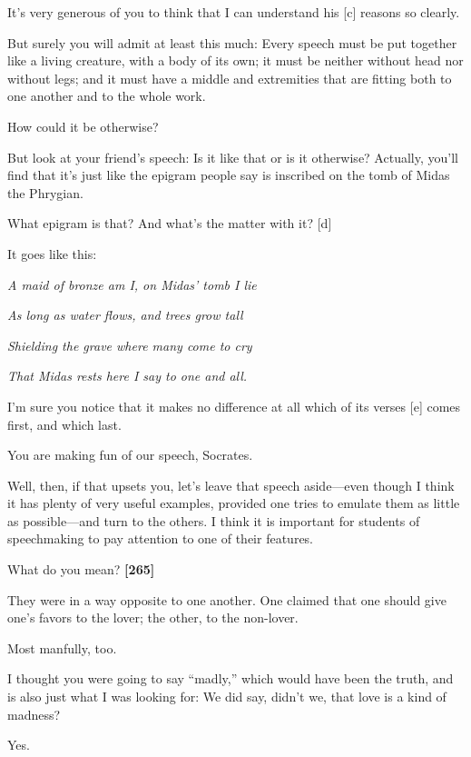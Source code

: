 \sayphaedrus It's very generous of you to think that I can understand his
{[}c{]} reasons so clearly.

\saysocrates But surely you will admit at least this much: Every speech
must be put together like a living creature, with a body of its own; it
must be neither without head nor without legs; and it must have a middle
and extremities that are fitting both to one another and to the whole
work.

\sayphaedrus How could it be otherwise?

\saysocrates But look at your friend's speech: Is it like that or is it
otherwise? Actually, you'll find that it's just like the epigram people
say is inscribed on the tomb of Midas the Phrygian.

\sayphaedrus What epigram is that? And what's the matter with it? {[}d{]}

\saysocrates It goes like this:\crlf
\crlf

{\em A maid of bronze am I, on Midas' tomb I lie}

{\em As long as water flows, and trees grow tall}

{\em Shielding the grave where many come to cry}

{\em That Midas rests here I say to one and all.}\crlf
\crlf

I'm sure you notice that it makes no difference at all which of its
verses {[}e{]} comes first, and which last.

\sayphaedrus You are making fun of our speech, Socrates.

\saysocrates Well, then, if that upsets you, let's leave that speech
aside---even though I think it has plenty of very useful examples,
provided one tries to emulate them as little as possible---and turn to
the others. I think it is important for students of speechmaking to pay
attention to one of their features.

\sayphaedrus What do you mean? {\bf {[}265{]}}

\saysocrates They were in a way opposite to one another. One claimed that
one should give one's favors to the lover; the other, to the non-lover.

\sayphaedrus Most manfully, too.

\saysocrates I thought you were going to say “madly,” which would have been
the truth, and is also just what I was looking for: We did say, didn't
we, that love is a kind of madness?

\sayphaedrus Yes.

